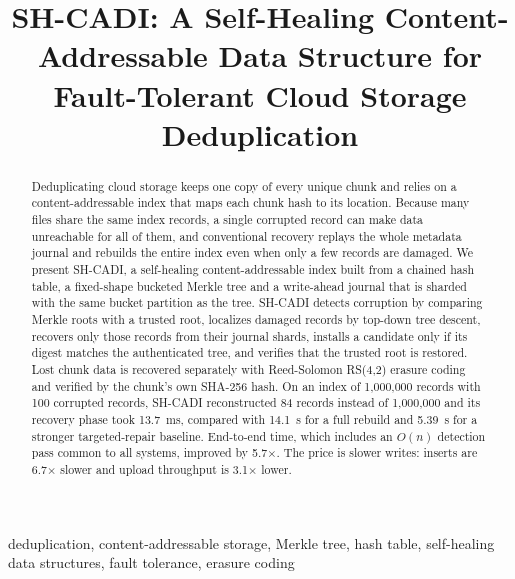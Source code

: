 \documentclass[conference]{IEEEtran}
\begin{document}
\title{SH-CADI: A Self-Healing Content-Addressable Data Structure for Fault-Tolerant Cloud Storage Deduplication}

\author{
\and
{}
\and
{}
\and
{}
}

\maketitle

\begin{abstract}
Deduplicating cloud storage keeps one copy of every unique chunk and relies on a content-addressable index that maps each chunk hash to its location. Because many files share the same index records, a single corrupted record can make data unreachable for all of them, and conventional recovery replays the whole metadata journal and rebuilds the entire index even when only a few records are damaged. We present SH-CADI, a self-healing content-addressable index built from a chained hash table, a fixed-shape bucketed Merkle tree and a write-ahead journal that is sharded with the same bucket partition as the tree. SH-CADI detects corruption by comparing Merkle roots with a trusted root, localizes damaged records by top-down tree descent, recovers only those records from their journal shards, installs a candidate only if its digest matches the authenticated tree, and verifies that the trusted root is restored. Lost chunk data is recovered separately with Reed-Solomon RS(4,2) erasure coding and verified by the chunk's own SHA-256 hash. On an index of 1,000,000 records with 100 corrupted records, SH-CADI reconstructed 84 records instead of 1,000,000 and its recovery phase took 13.7~ms, compared with 14.1~s for a full rebuild and 5.39~s for a stronger targeted-repair baseline. End-to-end time, which includes an $O(n)$ detection pass common to all systems, improved by 5.7$\times$. The price is slower writes: inserts are 6.7$\times$ slower and upload throughput is 3.1$\times$ lower.
\end{abstract}

\begin{IEEEkeywords}
deduplication, content-addressable storage, Merkle tree, hash table, self-healing data structures, fault tolerance, erasure coding
\end{IEEEkeywords}
\end{document}
